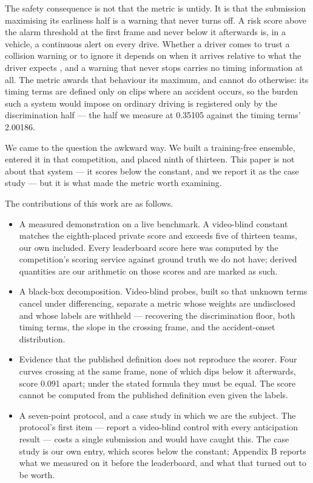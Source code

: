 The safety consequence is not that the metric is untidy. It is that the submission maximising its earliness half is a warning that never turns off. A risk score above the alarm threshold at the first frame and never below it afterwards is, in a vehicle, a continuous alert on every drive. Whether a driver comes to trust a collision warning or to ignore it depends on when it arrives relative to what the driver expects \citep{abe2006alarm}, and a warning that never stops carries no timing information at all. The metric awards that behaviour its maximum, and cannot do otherwise: its timing terms are defined only on clips where an accident occurs, so the burden such a system would impose on ordinary driving is registered only by the discrimination half --- the half we measure at 0.35105 against the timing terms' 2.00186.

We came to the question the awkward way. We built a training-free ensemble, entered it in that competition, and placed ninth of thirteen. This paper is not about that system --- it scores below the constant, and we report it as the case study --- but it is what made the metric worth examining.

The contributions of this work are as follows.

\begin{itemize}
\item
  A measured demonstration on a live benchmark. A video-blind constant matches the eighth-placed private score and exceeds five of thirteen teams, our own included. Every leaderboard score here was computed by the competition's scoring service against ground truth we do not have; derived quantities are our arithmetic on those scores and are marked as such.
\item
  A black-box decomposition. Video-blind probes, built so that unknown terms cancel under differencing, separate a metric whose weights are undisclosed and whose labels are withheld --- recovering the discrimination floor, both timing terms, the slope in the crossing frame, and the accident-onset distribution.
\item
  Evidence that the published definition does not reproduce the scorer. Four curves crossing at the same frame, none of which dips below it afterwards, score 0.091 apart; under the stated formula they must be equal. The score cannot be computed from the published definition even given the labels.
\item
  A seven-point protocol, and a case study in which we are the subject. The protocol's first item --- report a video-blind control with every anticipation result --- costs a single submission and would have caught this. The case study is our own entry, which scores below the constant; Appendix B reports what we measured on it before the leaderboard, and what that turned out to be worth.
\end{itemize}

